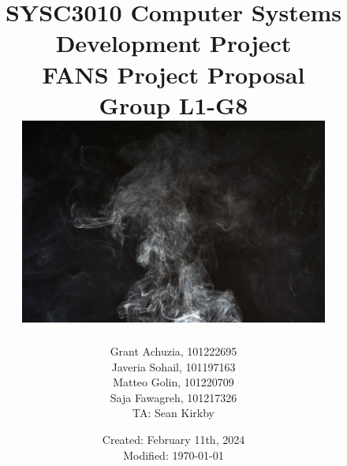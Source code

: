 \documentclass[11pt]{article}
\author{
    Grant Achuzia, 101222695 \\
    Javeria Sohail, 101197163 \\
    Matteo Golin, 101220709 \\
    Saja Fawagreh, 101217326 \\
    TA: Sean Kirkby
}
\title{
    SYSC3010 Computer Systems Development Project \\
    FANS Project Proposal \\
    {\large Group L1-G8} \\
    {
        \vspace{0.5in}
        \centering
        \includegraphics[width=4in]{../assets/header-image.jpg} \\
        \small \cite{header-img}
    }
}
\date{
    Created: February 11th, 2024 \\
    Modified: \today
}
\begin{document}
\maketitle
\pagebreak

\tableofcontents







\pagebreak
\printbibliography

\pagebreak

\end{document}

